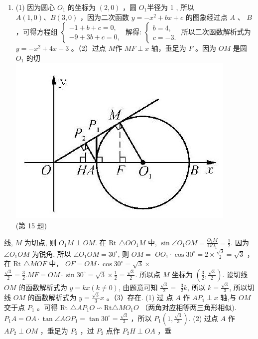 \documentclass[10pt]{article}
\begin{document}
\begin{enumerate}
  \item (1) 因为圆心 $O_{1}$ 的坐标为 $(2,0)$ ，圆 $O_{1}$半径为 1 , 所以 $A(1,0) 、 B(3,0)$ ，因为二次函数 $y=-x^{2}+b x+c$ 的图象经过点 $A$ 、 $B$ ，可得方程组 $\left\{\begin{array}{l}-1+b+c=0, \\ -9+3 b+c=0,\end{array}\right.$ 解得: $\left\{\begin{array}{l}b=4, \\ c=-3 .\end{array}\right.$ 所以二次函数解析式为 $y=-x^{2}+4 x-3$ 。（2）过点 $M$作 $M F \perp x$ 轴，垂足为 $F$ 。因为 $O M$ 是圆 $O_{1}$ 的切\\
\includegraphics[max width=\textwidth, center]{2024_10_30_1bf34f7aeb61f11d11d3g-132}\\
(第 15 题)
\end{enumerate}

线, $M$ 为切点, 则 $O_{1} M \perp O M$. 在 Rt $\triangle O O_{1} M$ 中, $\sin \angle O_{1} O M=\frac{O_{1} M}{O O_{1}}=\frac{1}{2}$. 因为 $\angle O_{1} O M$ 为锐角, 所以 $\angle O_{1} O M=30^{\circ}$, 则 $O M=$ $O O_{1} \cdot \cos 30^{\circ}=2 \times \frac{\sqrt{3}}{2}=\sqrt{3}$ ，在 Rt $\triangle M O F$ 中， $O F=O M \cdot \cos 30^{\circ}=\sqrt{3} \times$ $\frac{\sqrt{3}}{2}=\frac{3}{2} . M F=O M \cdot \sin 30^{\circ}=\sqrt{3} \times \frac{1}{2}=\frac{\sqrt{3}}{2}$. 所以点 $M$ 坐标为 $\left(\frac{3}{2}, \frac{\sqrt{3}}{2}\right)$. 设切线 $O M$ 的函数解析式为 $y=k x(k \neq 0)$, 由题意可知 $\frac{\sqrt{3}}{2}=$ $\frac{3}{2} k$, 所以 $k=\frac{\sqrt{3}}{3}$, 所以切线 $O M$ 的函数解析式为 $y=\frac{\sqrt{3}}{3} x$ 。（3）存在. (1) 过 点 $A$ 作 $A P_{1} \perp x$ 轴,与 $O M$ 交于点 $P_{1}$ 。可得 Rt $\triangle A P_{1} O \backsim \mathrm{Rt} \triangle M O_{1} O$ （两角对应相等两三角形相似). $P_{1} A=O A \cdot \tan \angle A O P_{1}=\tan 30^{\circ}=\frac{\sqrt{3}}{3}$ ，所以 $P_{1}\left(1, \frac{\sqrt{3}}{3}\right)$. (2) 过点 $A$ 作 $A P_{2} \perp O M$ ，垂足为 $P_{2}$ ，过 $P_{2}$ 点作 $P_{2} H \perp O A$ ，垂
\end{document}
